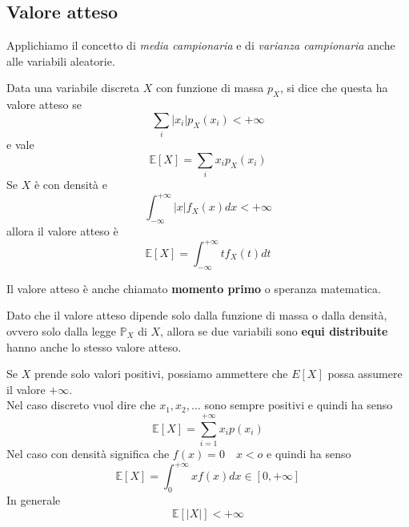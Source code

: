 \subsection{Valore atteso}
Applichiamo il concetto di \textit{media campionaria} e di \textit{varianza campionaria} anche alle variabili aleatorie.
\begin{definition}
	Data una variabile discreta $X$ con funzione di massa $p_X$, si dice che questa ha valore atteso se
	\begin{equation*}
		\sum_{i}\lvert x_i \rvert p_X(x_i) < +\infty
	\end{equation*}
	e vale
	\begin{equation}
		\mathbb{E}[X]=\sum_{i}x_ip_X(x_i)
	\end{equation}
	Se $X$ è con densità e
	\begin{equation*}
		\int_{-\infty}^{+\infty} \lvert x \rvert f_X(x) dx < + \infty
	\end{equation*}
	allora il valore atteso è
	\begin{equation}
		\mathbb{E}[X]=\int_{-\infty}^{+\infty}t f_X(t)dt
	\end{equation}
\end{definition}

\begin{note}
	Il valore atteso è anche chiamato \textbf{momento primo} o speranza matematica.
\end{note}

\begin{observation}
	Dato che il valore atteso dipende solo dalla funzione di massa o dalla densità, ovvero solo dalla legge $\mathbb{P}_X$ di $X$, allora se due variabili sono \textbf{equi distribuite} hanno anche lo stesso valore atteso.
\end{observation}

\begin{observation}
	Se $X$ prende solo valori positivi, possiamo ammettere che $E[X]$ possa assumere il valore $+\infty$.\\
	Nel caso discreto vuol dire che $x_1, x_2, \ldots$ sono sempre positivi e quindi ha senso
	\begin{equation*}
		\mathbb{E}[X]=\sum_{i=1}^{+\infty} x_i p(x_i)
	\end{equation*}
	Nel caso con densità significa che $f(x)=0 \quad x<o$ e quindi ha senso
	\begin{equation*}
		\mathbb{E}[X] = \int_{0}^{+\infty} xf(x)dx \in [0, +\infty]
	\end{equation*}
	In generale
	\begin{equation}
		\mathbb{E}[\lvert X \rvert] < + \infty
	\end{equation}
\end{observation}


